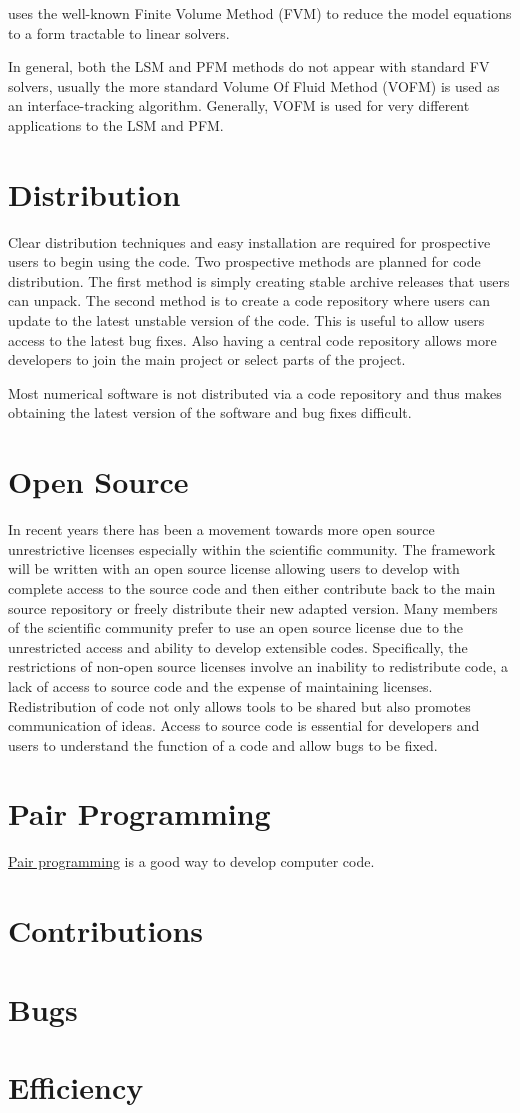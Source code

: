\FiPy{} uses the well-known Finite Volume Method (FVM) to reduce the
model equations to a form tractable to linear solvers.

In general, both the LSM and PFM methods do not appear with standard
FV solvers, usually the more standard Volume Of Fluid Method (VOFM) is
used as an interface-tracking algorithm. Generally, VOFM is used for
very different applications to the LSM and PFM.

\section{Distribution}

Clear distribution techniques and easy installation are required for
prospective users to begin using the code. Two prospective methods are
planned for code distribution. The first method is simply creating
stable archive releases that users can unpack. The second method is to
create a code repository where users can update to the latest unstable
version of the code. This is useful to allow users access to the
latest bug fixes. Also having a central code repository allows more
developers to join the main project or select parts of the project.

Most numerical software is not distributed via a code repository and
thus makes obtaining the latest version of the software and bug fixes
difficult.

\section{Open Source}

In recent years there has been a movement towards more open source
unrestrictive licenses especially within the scientific community. The
\FiPy{} framework will be written with an open source license allowing
users to develop with complete access to the source code and then
either contribute back to the main source repository or freely
distribute their new adapted version. Many members of the scientific
community prefer to use an open source license due to the unrestricted
access and ability to develop extensible codes. Specifically, the
restrictions of non-open source licenses involve an inability to
redistribute code, a lack of access to source code and the expense of
maintaining licenses. Redistribution of code not only allows tools to
be shared but also promotes communication of ideas. Access to source
code is essential for developers and users to understand the function
of a code and allow bugs to be fixed.

\section{Pair Programming}

\href{http://www.extremeprogramming.org/rules/pair.html}{Pair programming} is a good way to develop computer code.

\section{Contributions}

\section{Bugs}

\section{Efficiency}